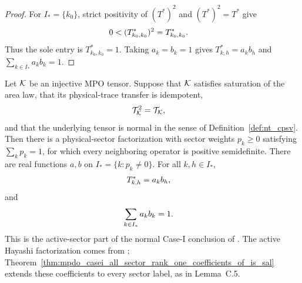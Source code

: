 \begin{proof}
    \leanok
    For $I_*=\{k_0\}$, strict positivity of $(T^*)^2$ and
    $(T^*)^2=T^*$ give
    \begin{align}
        0 & <(T^*_{k_0,k_0})^2=T^*_{k_0,k_0}.
        \notag
    \end{align}
    Thus the sole entry is $T^*_{k_0,k_0}=1$. Taking $a_k=b_k=1$ gives
    $T^*_{k,h}=a_kb_h$ and
    $\sum_{k\in I_*}a_kb_k=1$.
\end{proof}

\begin{lemma}
    \label{thm:mpdo_casei_rank_one_coefficients_of_is_sal}
    \leanok
    Let ${\cal K}$ be an injective MPO tensor. Suppose
    that ${\cal K}$ satisfies saturation of the area law, that its physical-trace
    transfer is idempotent,
    \begin{align}
        \mathcal T_{\cal K}^2 & =\mathcal T_{\cal K},
        \notag
    \end{align}
    and that the underlying tensor is normal in the sense of
    Definition~\ref{def:nt_cpsv}. Then there is a physical-sector factorization
    with sector weights $p_k\geq0$ satisfying $\sum_kp_k=1$, for which every
    neighboring operator is positive semidefinite. There are real functions
    $a,b$ on
    $I_*=\{k:p_k\ne0\}$. For all $k,h\in I_*$,
    \begin{align}
        T^*_{k,h} & =a_kb_h,
        \notag
    \end{align}
    and
    \begin{align}
        \sum_{k\in I_*}a_kb_k & =1.
        \notag
    \end{align}
    This is the active-sector part of the normal Case-I conclusion of
    \cite[Appendix~C.2, Case~I, lines~1374--1381]{Cirac2016MPDO_arXiv}.
    The active Hayashi factorization comes from
    \cite[Appendix~C.2, Lemma~C.4, lines~1406--1471]{Cirac2016MPDO_arXiv};
    Theorem~\ref{thm:mpdo_casei_all_sector_rank_one_coefficients_of_is_sal}
    extends these coefficients to every sector label, as in Lemma~C.5.
\end{lemma}

